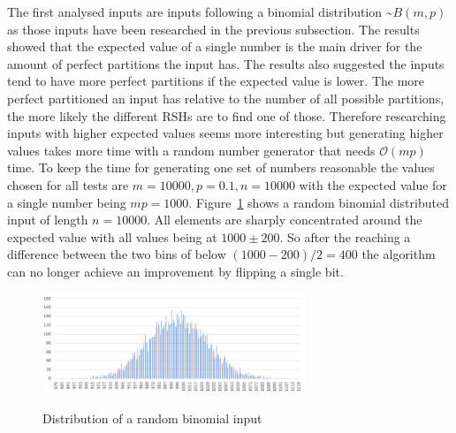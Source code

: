 The first analysed inputs are inputs following a binomial distribution \textasciitilde$B(m,p)$ as those inputs have been researched in the previous subsection.
The results showed that the expected value of a single number is the main driver for the amount of perfect partitions the input has.
The results also suggested the inputs tend to have more perfect partitions if the expected value is lower.
The more perfect partitioned an input has relative to the number of all possible partitions, the more likely the different RSHs are to find one of those.
Therefore researching inputs with higher expected values seems more interesting but generating higher values takes more time with a random number generator that needs $\mathcal{O}(mp)$ time.
To keep the time for generating one set of numbers reasonable the values chosen for all tests are $m=10000, p=0.1, n=10000$ with the expected value for a single number being $mp=1000$.
Figure~\ref{fig:binDistExample} shows a random binomial distributed input of length $n=10000$.
All elements are sharply concentrated around the expected value with all values being at $1000\pm200$.
So after the reaching a difference between the two bins of below $(1000-200)/2=400$ the algorithm can no longer achieve an improvement by flipping a single bit.

\begin{figure}[h]
      \caption{Distribution of a random binomial input}
      \centering
      \includegraphics[width=0.7\textwidth]{figures/images/numberGenerator/binomialDistributionForN10000p0_1.png}\label{fig:binDistExample}
\end{figure}